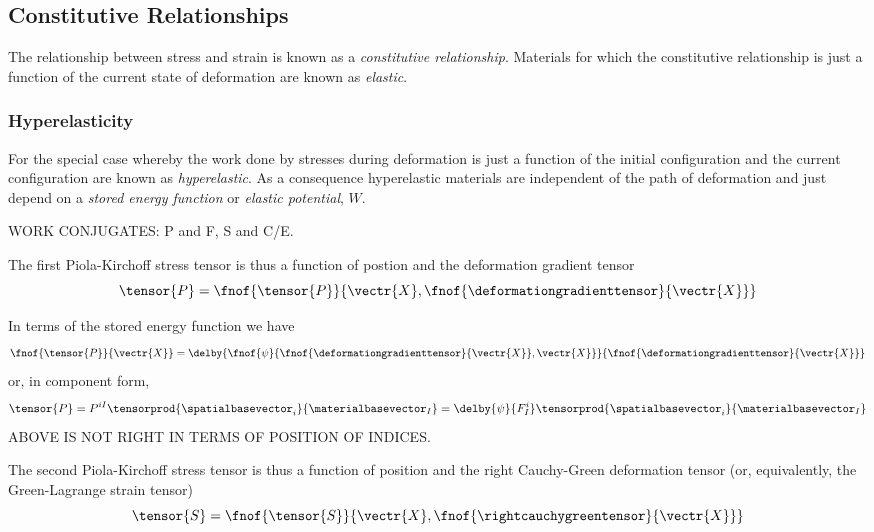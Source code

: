 \subsection{Constitutive Relationships}

The relationship between stress and strain is known as a \emph{constitutive
  relationship}. Materials for which the constitutive relationship is just a
function of the current state of deformation are known as \emph{elastic}.

\subsubsection{Hyperelasticity}

For the special case whereby the work done by stresses during deformation is
just a function of the initial configuration and the current configuration are
known as \emph{hyperelastic}. As a consequence hyperelastic materials are
independent of the path of deformation and just depend on a \emph{stored
  energy function} or \emph{elastic potential}, $W$.

WORK CONJUGATES: P and F, S and C/E.

The first Piola-Kirchoff stress tensor is thus a function of postion and the
deformation gradient tensor \ie
\begin{equation}
  \tensor{P}=\fnof{\tensor{P}}{\vectr{X},\fnof{\deformationgradienttensor}{\vectr{X}}}
\end{equation}

In terms of the stored energy function we have
\begin{equation}
  \fnof{\tensor{P}}{\vectr{X}}=\delby{\fnof{\psi}{\fnof{\deformationgradienttensor}{\vectr{X}},\vectr{X}}}{\fnof{\deformationgradienttensor}{\vectr{X}}}
\end{equation}
or, in component form,
\begin{equation}
  \tensor{P}=P^{iI}\tensorprod{\spatialbasevector_{i}}{\materialbasevector_{I}}=\delby{\psi}{F^{i}_{I}}\tensorprod{\spatialbasevector_{i}}{\materialbasevector_{I}}
\end{equation}
ABOVE IS NOT RIGHT IN TERMS OF POSITION OF INDICES.

The second Piola-Kirchoff stress tensor is thus a function of position and
the right Cauchy-Green deformation tensor (or, equivalently, the
Green-Lagrange strain tensor) \ie
\begin{equation}
  \tensor{S}=\fnof{\tensor{S}}{\vectr{X},\fnof{\rightcauchygreentensor}{\vectr{X}}}
\end{equation}


